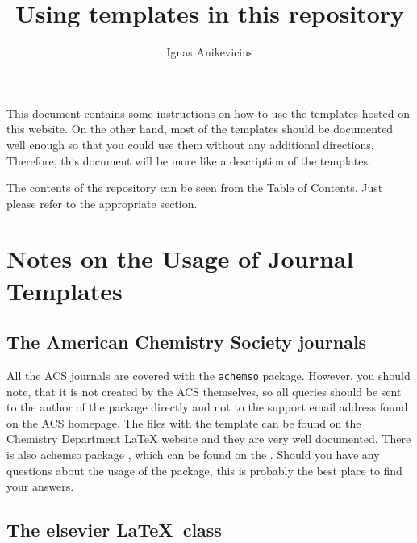


\title{Using templates in this repository}
\author{Ignas Anikevicius}



\maketitle

This document contains some instructions on how to use the templates hosted on
this website. 
%
On the other hand, most of the templates should be documented well enough so
that you could use them without any additional directions.
%
Therefore, this document will be more like a description of the templates.

The contents of the repository can be seen from the Table of Contents.
%
Just please refer to the appropriate section.


\tableofcontents
\clearpage

\section{Notes on the Usage of Journal Templates}

\subsection{The American Chemistry Society journals}

All the ACS journals are covered with the \verb|achemso| package. 
%
However, you should note, that it is not created by the ACS themselves, so all
queries should be sent to the author of the package directly and not to the
support email address found on the ACS homepage.
%
The files with the template can be found on the Chemistry Department
\LaTeX{} website and they are very well documented.
%
There is also achemso package
,
which can be found on the
.
%
Should you have any questions about the usage of the package, this is probably
the best place to find your answers.

\subsection{The elsevier \LaTeX\ class}

